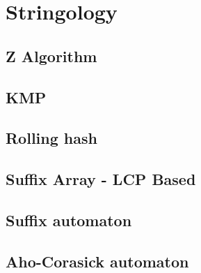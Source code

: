 \section{Stringology}

\subsection{Z Algorithm} 


\subsection{KMP}



%

\subsection{Rolling hash}



%

\subsection{Suffix Array - LCP Based}



\subsection{Suffix automaton}


\subsection{Aho-Corasick automaton}

